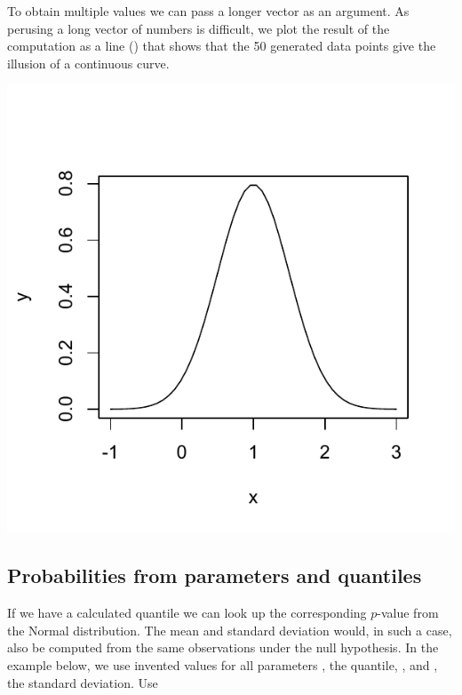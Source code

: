 \documentclass[krantz2]{krantz}\usepackage{knitr}
\begin{document}
To obtain multiple values we can pass a longer vector as an argument. As perusing a long vector of numbers is difficult, we plot the result of the computation as a line () that shows that the 50 generated data points give the illusion of a continuous curve.

\begin{knitrout}\footnotesize
{}\color{fgcolor}\begin{kframe}
\begin{alltt}
 \hlkwb{<-} \hlstd{(} \hlstd{=} \hlopt{-}\hlstd{,}  \hlstd{=} \hlstd{,}  \hlstd{=} \hlstd{)}

 \hlkwb{<-} \hlstd{(} 
                       \hlstd{=} \hlstd{(}   \hlstd{=} \hlstd{,}  \hlstd{=} \hlstd{))}
\hlopt{~}    \hlstd{=} \hlstd{)}
\end{alltt}
\end{kframe}

{\centering \includegraphics[width=.54\textwidth]{figure/pos-distrib-01a-1} 

}


\end{knitrout}

\subsection{Probabilities from parameters and quantiles}\label{sec:prob:quant}

If we have a calculated quantile we can look up the corresponding $p$-value from the Normal distribution. The mean and standard deviation would, in such a case, also be computed from the same observations under the null hypothesis. In the example below, we use invented values for all parameters , the quantile, , and , the standard deviation. Use
\end{document}
